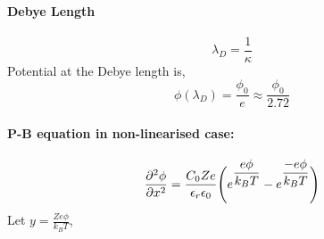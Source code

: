 \documentclass[12pt,a4paper,twocolumn]{article}
\begin{document}
\paragraph*{Debye Length}
\begin{equation}
	\lambda_D=\frac{1}{\kappa}
\end{equation}
Potential at the Debye length is,
\begin{equation*}
	\phi(\lambda_D)=\frac{\phi_0}{e}\approx \frac{\phi_0}{2.72}
\end{equation*}

\paragraph*{P-B equation in non-linearised case:}
$$\pdv[2]{\phi}{x}=\dfrac{C_0 Ze}{\epsilon_r \epsilon_0}\Bigg(e^{\dfrac{e\phi}{k_B T}}-e^{\dfrac{-e\phi}{k_B T}}\Bigg)$$
Let $y=\frac{Ze\phi}{k_B T}$,
\end{document}
